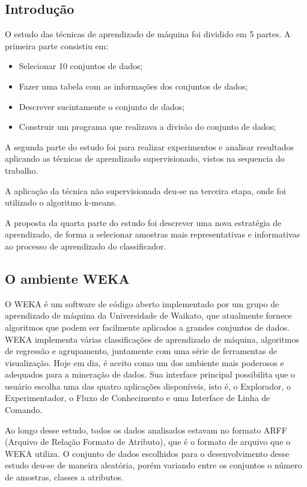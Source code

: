 \documentclass[12pt]{article}
\begin{document}
\subsection{Introdução} \label{sec:introducao}

O estudo das técnicas de aprendizado de máquina foi dividido em 5 partes. A primeira parte consistiu em:

\begin{itemize}
	\item Selecionar 10 conjuntos de dados;
	\item Fazer uma tabela com as informações dos conjuntos de dados;
	\item Descrever sucintamente o conjunto de dados;
	\item Construir um programa que realizava a divisão do conjunto de dados;
\end{itemize}

A segunda parte do estudo foi para realizar experimentos e analisar resultados aplicando as técnicas de aprendizado supervisionado, vistos na sequencia do trabalho.

A aplicação da técnica não supervisionada deu-se na terceira etapa, onde foi utilizado o algoritmo k-means.

A proposta da quarta parte do estudo foi descrever uma nova estratégia de aprendizado, de forma a selecionar amostras mais representativas e informativas ao processo de aprendizado do classificador.

\subsection{O ambiente WEKA} \label{sec:ambienteweka}

    O WEKA é um software de código aberto implementado por um grupo de aprendizado de máquina da Universidade de Waikato, que atualmente fornece algoritmos que podem ser facilmente aplicados a grandes conjuntos de dados. WEKA implementa várias classificações de aprendizado de máquina, algoritmos de regressão e agrupamento, juntamente com uma série de ferramentas de visualização. Hoje \cite{cancer} em dia, é aceito como um dos ambiente mais poderosos e adequados para a mineração de dados. Sua interface principal possibilita que o usuário escolha uma das quatro aplicações disponíveis, isto é, o Explorador, o Experimentador, o Fluxo de Conhecimento e uma Interface de Linha de Comando.
    
    Ao longo desse estudo, todos os dados analisados estavam no formato ARFF (Arquivo de Relação Formato de Atributo), que é o formato  de arquivo que o WEKA utiliza. O conjunto de dados escolhidos para o desenvolvimento desse estudo deu-se de maneira aleatória, porém variando entre os conjuntos o número de amostras, classes a atributos.
    
\end{document}
